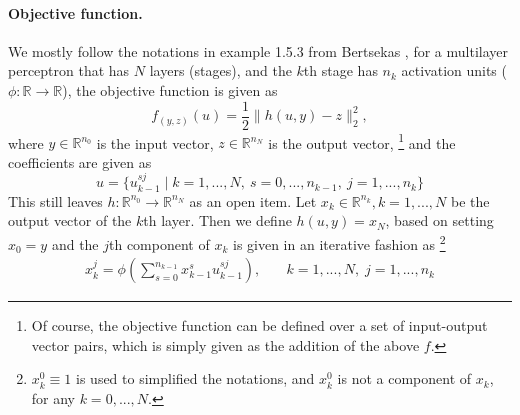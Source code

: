 \paragraph{Objective function.}
We mostly follow the notations in example 1.5.3 from Bertsekas \cite{bertsekas1999nonlinear}, for a multilayer perceptron that has $N$ layers (stages), and the $k$th stage has $n_k$ activation units ($\phi : \mathbb{R} \to \mathbb{R}$), the objective function is given as
\[f_{(y, z)}(u) = \frac{1}{2} \|h(u, y) - z\|_2^2,\]
where $y \in \mathbb{R}^{n_0}$ is the input vector, $z \in \mathbb{R}^{n_N}$ is the output vector,
\footnote{Of course, the objective function can be defined over a set of input-output vector pairs, which is simply given as the addition of the above $f$.}
and the coefficients are given as
\[u = \{ u_{k-1}^{sj} \; | \; k = 1,...,N, \: s = 0,...,n_{k-1}, \: j = 1,...,n_k\}\]
This still leaves $h : \mathbb{R}^{n_0} \to \mathbb{R}^{n_N}$ as an open item. 
Let $x_k \in \mathbb{R}^{n_k}, k = 1,...,N$ be the output vector of the $k$th layer. Then we define $h(u, y) = x_N$, based on setting $x_0 = y$ and the $j$th component of $x_k$ is given in an iterative fashion as
\footnote{$x_k^0 \equiv 1$ is used to simplified the notations, and $x_k^0$ is not a component of $x_k$, for any $k = 0,...,N$.}
\[\begin{alignedat}{5}
    x_k^j = \phi \left( \sum_{s=0}^{n_{k-1}} x_{k-1}^s u_{k-1}^{sj} \right), &\quad k = 1,...,N, \; j = 1,...,n_k
\end{alignedat}\]


